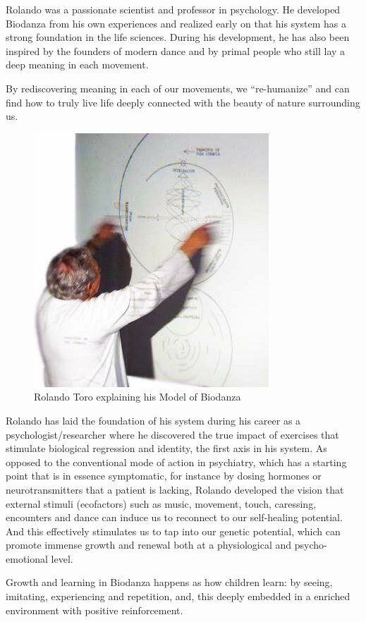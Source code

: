 \documentclass[
  11pt,
]{book}
\begin{document}
Rolando was a passionate scientist and professor in psychology. He developed Biodanza from his own experiences and realized early on that his system has a strong foundation in the life sciences. During his development, he has also been inspired by the founders of modern dance and by primal people who still lay a deep meaning in each movement.

By rediscovering meaning in each of our movements, we ``re-humanize'' and can find how to truly live life deeply connected with the beauty of nature surrounding us.

\begin{figure}

{\centering \includegraphics[width=0.45\linewidth]{./figs/rolandoAndModel} 

}

\caption{Rolando Toro explaining his Model of Biodanza}\label{fig:rolandoModel}
\end{figure}

Rolando has laid the foundation of his system during his career as a psychologist/researcher where he discovered the true impact of exercises that stimulate biological regression and identity, the first axis in his system. As opposed to the conventional mode of action in psychiatry, which has a starting point that is in essence symptomatic, for instance by dosing hormones or neurotransmitters that a patient is lacking, Rolando developed the vision that external stimuli (ecofactors) such as music, movement, touch, caressing, encounters and dance can induce us to reconnect to our self-healing potential. And this effectively stimulates us to tap into our genetic potential, which can promote immense growth and renewal both at a physiological and psycho-emotional level.

Growth and learning in Biodanza happens as how children learn: by seeing, imitating, experiencing and repetition, and, this deeply embedded in a enriched environment with positive reinforcement.
\end{document}
